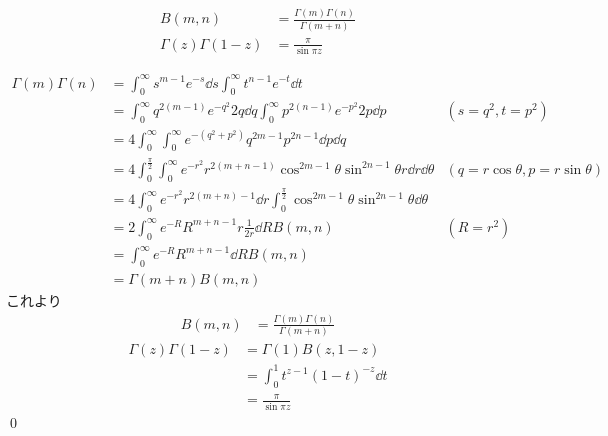 \documentclass[uplatex,dvipdfmx,a4paper,11pt]{jlreq}
\makeatletter
\theoremstyle{definition}
\renewenvironment{proof}[1][\proofname]{\par
  \normalfont
  \topsep6\p@\@plus6\p@ \trivlist
  \item[\hskip\labelsep{\bfseries #1}\@addpunct{\bfseries}]\ignorespaces\quad\par
}{%
  \qed\endtrivlist\@endpefalse
}
\renewcommand\proofname{証明}
\makeatother
\begin{document}
\begin{proposition}[ガンマ関数とベータ関数との関係]
  \begin{align}
    B(m, n)                & = \frac{\Gamma(m)\Gamma(n)}{\Gamma(m + n)} \\
    \Gamma(z)\Gamma(1 - z) & = \frac{\pi}{\sin\pi z}
  \end{align}
\end{proposition}
\begin{proof}
  \begin{align}
    \Gamma(m)\Gamma(n) & = \int_0^\infty s^{m-1}e^{-s}\dd{s}\int_0^\infty t^{n-1}e^{-t}\dd{t}                                                                                      \\
                       & = \int_0^\infty q^{2(m-1)}e^{-q^2}2q\dd{q}\int_0^\infty p^{2(n-1)}e^{-p^2}2p\dd{p}                                   & (s = q^2, t = p^2)                 \\
                       & = 4\int_0^\infty \int_0^\infty e^{-(q^2 + p^2)}q^{2m-1}p^{2n-1}\dd{p}\dd{q}                                                                               \\
                       & = 4\int_0^{\frac{\pi}{2}}\int_0^\infty e^{-r^2}r^{2(m + n - 1)}\cos^{2m-1}\theta\sin^{2n-1}\theta r\dd{r}\dd{\theta} & (q = r\cos\theta, p = r\sin\theta) \\
                       & = 4\int_0^\infty e^{-r^2}r^{2(m + n) - 1}\dd{r}\int_0^{\frac{\pi}{2}}\cos^{2m-1}\theta\sin^{2n-1}\theta\dd{\theta}                                        \\
                       & = 2\int_0^\infty e^{-R}R^{m + n - 1}r\frac{1}{2r}\dd{R}B(m, n)                                                       & (R = r^2)                          \\
                       & = \int_0^\infty e^{-R}R^{m + n - 1}\dd{R}B(m, n)                                                                                                          \\
                       & = \Gamma(m + n)B(m, n)
  \end{align}
  これより
  \begin{align}
    B(m, n) & = \frac{\Gamma(m)\Gamma(n)}{\Gamma(m + n)}
  \end{align}
  \begin{align}
    \Gamma(z)\Gamma(1 - z) & = \Gamma(1)B(z, 1 - z)                \\
                           & = \int_{0}^{1}t^{z-1}(1-t)^{-z}\dd{t} \\
                           & = \frac{\pi}{\sin\pi z}
  \end{align}
\end{proof}
\end{document}
